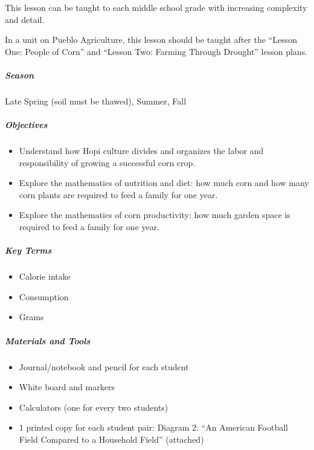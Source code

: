 \documentclass[12pt,]{article}
\providecommand{\tightlist}{%
  \setlength{\itemsep}{0pt}\setlength{\parskip}{0pt}}
\let\oldsubparagraph\subparagraph
\renewcommand{\subparagraph}[1]{\oldsubparagraph{#1}\mbox{}}
\begin{document}
This lesson can be taught to each middle school grade with increasing
complexity and detail.

In a unit on Pueblo Agriculture, this lesson should be taught after the ``Lesson One: People of Corn'' and ``Lesson Two: Farming Through Drought'' lesson plans.

\hypertarget{season-1}{%
\subparagraph{Season}\label{season-1}}

Late Spring (soil must be thawed), Summer, Fall

\hypertarget{objectives-1}{%
\subparagraph{Objectives}\label{objectives-1}}

\begin{itemize}
\tightlist
\item
  Understand how Hopi culture divides and organizes the labor and responsibility of growing a successful corn crop.
\item
  Explore the mathematics of nutrition and diet: how much corn and how many corn plants are required to feed a family for one year.
\item
  Explore the mathematics of corn productivity: how much garden space is required to feed a family for one year.
\end{itemize}

\hypertarget{key-terms-1}{%
\subparagraph{Key Terms}\label{key-terms-1}}

\begin{itemize}
\tightlist
\item
  Calorie intake
\item
  Consumption
\item
  Grams
\end{itemize}

\hypertarget{materials-and-tools-1}{%
\subparagraph{Materials and Tools}\label{materials-and-tools-1}}

\begin{itemize}
\tightlist
\item
  Journal/notebook and pencil for each student
\item
  White board and markers
\item
  Calculators (one for every two students)
\item
  1 printed copy for each student pair: Diagram 2: ``An American Football Field Compared to a Household Field'' (attached)
\end{itemize}
\end{document}
